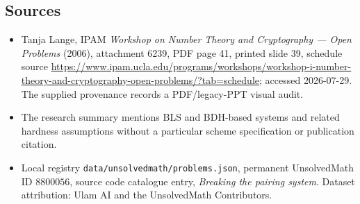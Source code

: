 \documentclass[11pt]{article}
\begin{document}
\subsection{Sources}
\begin{itemize}
\item Tanja Lange, IPAM \emph{Workshop on Number Theory and Cryptography --- Open Problems} (2006), attachment 6239, PDF page 41, printed slide 39, schedule source \url{https://www.ipam.ucla.edu/programs/workshops/workshop-i-number-theory-and-cryptography-open-problems/?tab=schedule}; accessed 2026-07-29. The supplied provenance records a PDF/legacy-PPT visual audit.
\item The research summary mentions BLS and BDH-based systems and related hardness assumptions without a particular scheme specification or publication citation.
\item Local registry \texttt{data/unsolvedmath/problems.json}, permanent UnsolvedMath ID $8800056$, source code catalogue entry, \emph{Breaking the pairing system}. Dataset attribution: Ulam AI and the UnsolvedMath Contributors.
\end{itemize}
\end{document}
